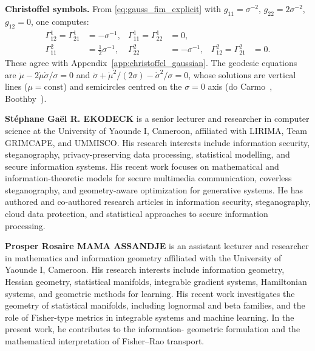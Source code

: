 \documentclass[a4paper,fleqn]{cas-dc}
\begin{document}
\textbf{Christoffel symbols.}
From \eqref{eq:gauss_fim_explicit} with $g_{11}=\sigma^{-2}$,
$g_{22}=2\sigma^{-2}$, $g_{12}=0$, one computes:
\begin{equation}
\begin{aligned}
  \Gamma^1_{12} = \Gamma^1_{21} &= -\sigma^{-1}, &
  \Gamma^1_{11} = \Gamma^1_{22} &= 0, \\
  \Gamma^2_{11} &= \tfrac{1}{2}\sigma^{-1}, &
  \Gamma^2_{22} &= -\sigma^{-1}, &
  \Gamma^2_{12} = \Gamma^2_{21} &= 0.
\end{aligned}
  \label{eq:gauss_christoffel_app}
\end{equation}
These agree with Appendix~\ref{app:christoffel_gaussian}.
The geodesic equations are
$\ddot\mu - 2\dot\mu\dot\sigma/\sigma = 0$ and
$\ddot\sigma + \dot\mu^2/(2\sigma) - \dot\sigma^2/\sigma = 0$,
whose solutions are vertical lines ($\mu=\mathrm{const}$) and
semicircles centred on the $\sigma=0$ axis
(do Carmo~\cite{do2002riemannian}, Boothby~\cite{boothby1986differentiable}).


\newpage
\noindent\textbf{St\'ephane Ga\"el R. EKODECK}
is a senior lecturer and researcher in computer science at the University of Yaounde I, Cameroon,
affiliated with LIRIMA, Team GRIMCAPE, and UMMISCO. His research interests
include information security, steganography, privacy-preserving data
processing, statistical modelling, and secure information systems. His recent
work focuses on mathematical and information-theoretic models for secure
multimedia communication, coverless steganography, and geometry-aware
optimization for generative systems. He has authored and co-authored research
articles in information security, steganography, cloud data protection, and
statistical approaches to secure information processing.
\endbio

\vspace{0.5em}

\noindent\textbf{Prosper Rosaire MAMA ASSANDJE}
is an assistant lecturer and researcher in mathematics and information geometry affiliated with the
University of Yaounde I, Cameroon. His research interests include information
geometry, Hessian geometry, statistical manifolds, integrable gradient systems,
Hamiltonian systems, and geometric methods for learning. His recent work
investigates the geometry of statistical manifolds, including lognormal and
beta families, and the role of Fisher-type metrics in integrable systems and
machine learning. In the present work, he contributes to the information-
geometric formulation and the mathematical interpretation of Fisher--Rao
transport.
\endbio
\end{document}
